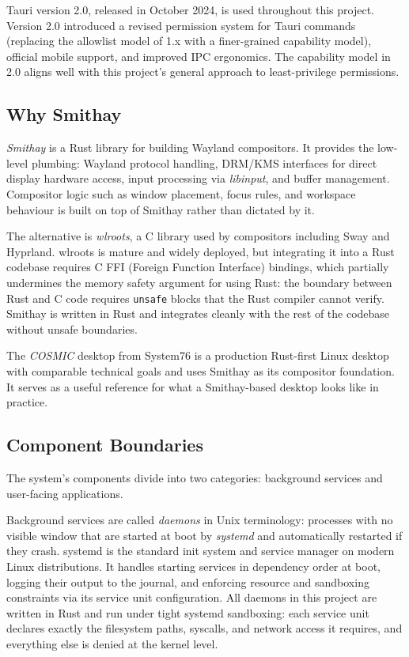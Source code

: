Tauri version 2.0, released in October 2024, is used throughout this project.
Version 2.0 introduced a revised permission system for Tauri commands (replacing
the allowlist model of 1.x with a finer-grained capability model), official
mobile support, and improved IPC ergonomics. The capability model in 2.0 aligns
well with this project's general approach to least-privilege permissions.

\subsection{Why Smithay}
\label{sec:smithay-intro}

\emph{Smithay} is a Rust library for building Wayland compositors. It provides
the low-level plumbing: Wayland protocol handling, DRM/KMS interfaces for direct
display hardware access, input processing via \emph{libinput}, and buffer
management. Compositor logic such as window placement, focus rules, and workspace
behaviour is built on top of Smithay rather than dictated by it.

The alternative is \emph{wlroots}, a C library used by compositors including
Sway and Hyprland. wlroots is mature and widely deployed, but integrating it
into a Rust codebase requires C FFI (Foreign Function Interface) bindings, which
partially undermines the memory safety argument for using Rust: the boundary
between Rust and C code requires \texttt{unsafe} blocks that the Rust compiler
cannot verify. Smithay is written in Rust and integrates cleanly with the rest
of the codebase without unsafe boundaries.

The \emph{COSMIC} desktop from System76 is a production Rust-first Linux desktop
with comparable technical goals and uses Smithay as its compositor foundation.
It serves as a useful reference for what a Smithay-based desktop looks like in
practice.

\subsection{Component Boundaries}
\label{sec:component-boundaries}

The system's components divide into two categories: background services and
user-facing applications.

Background services are called \emph{daemons} in Unix terminology: processes
with no visible window that are started at boot by \emph{systemd} and
automatically restarted if they crash. systemd is the standard init system and
service manager on modern Linux distributions. It handles starting services in
dependency order at boot, logging their output to the journal, and enforcing
resource and sandboxing constraints via its service unit configuration. All
daemons in this project are written in Rust and run under tight systemd
sandboxing: each service unit declares exactly the filesystem paths, syscalls,
and network access it requires, and everything else is denied at the kernel
level.

